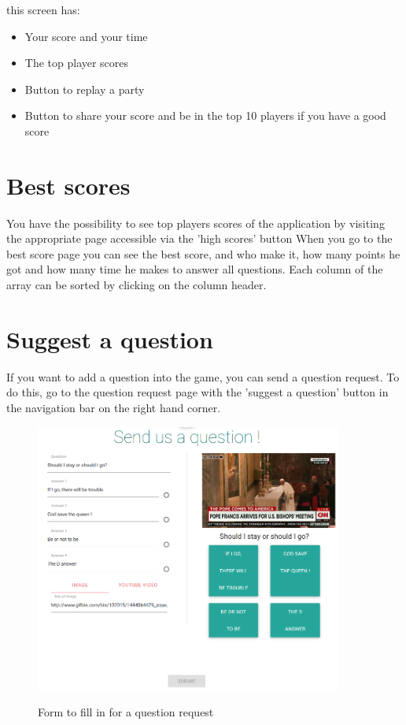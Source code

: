 \documentclass[a4paper,11pt, oneside]{book}
\begin{document}
this screen has:
\begin{itemize}
\item Your score and your time
\item The top player scores
\item Button to replay a party
\item Button to share your score and be in the top 10 players if you have a good score
\end{itemize}

\section{Best scores}
You have the possibility to see top players scores of the application by visiting the appropriate page accessible via the 'high scores' button
When you go to the best score page you can see the best score, and who make it, how many points he got and how many time he makes to answer all questions.
Each column of the array can be sorted by clicking on the column header.

\section{Suggest a question}
If you want to add a question into the game, you can send a question request.
To do this, go to the question request page with the 'suggest a question' button in the navigation bar on the right hand corner.

\begin{figure} [htbp]
	\centering
	\includegraphics[width=0.9\textwidth]{CQuestion.png}\\
	\caption{Form to fill in for a question request}
\end{figure}
\end{document}
